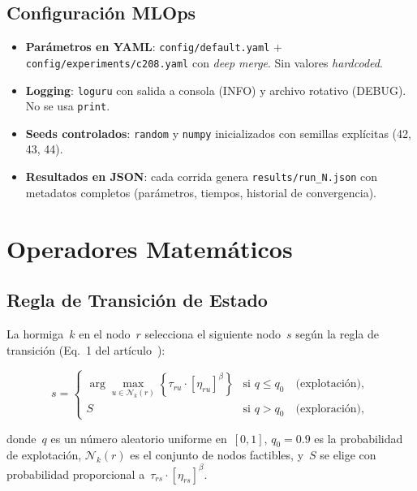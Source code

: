 \documentclass[12pt, letterpaper]{article}
\begin{document}
\subsection{Configuración MLOps}

\begin{itemize}[leftmargin=2cm]
  \item \textbf{Parámetros en YAML}: \texttt{config/default.yaml} + \texttt{config/experiments/c208.yaml} con \textit{deep merge}. Sin valores \textit{hardcoded}.
  \item \textbf{Logging}: \texttt{loguru} con salida a consola (INFO) y archivo rotativo (DEBUG). No se usa \texttt{print}.
  \item \textbf{Seeds controlados}: \texttt{random} y \texttt{numpy} inicializados con semillas explícitas (42, 43, 44).
  \item \textbf{Resultados en JSON}: cada corrida genera \texttt{results/run\_N.json} con metadatos completos (parámetros, tiempos, historial de convergencia).
\end{itemize}

\newpage
\section{Operadores Matemáticos}
\label{sec:operadores}

\subsection{Regla de Transición de Estado}

La hormiga~$k$ en el nodo~$r$ selecciona el siguiente nodo~$s$ según la regla de transición (Eq.~1 del artículo~\cite{gambardella1999}):

\begin{equation}
  s = \begin{cases}
    \displaystyle\arg\max_{u \in \mathcal{N}_k(r)} \left\{ \tau_{ru} \cdot [\eta_{ru}]^{\beta} \right\}
    & \text{si } q \leq q_0 \quad \text{(explotación)}, \\[12pt]
    S & \text{si } q > q_0 \quad \text{(exploración)},
  \end{cases}
  \label{eq:transition}
\end{equation}

\noindent donde~$q$ es un número aleatorio uniforme en~$[0,1]$, $q_0 = 0.9$ es la probabilidad de explotación, $\mathcal{N}_k(r)$ es el conjunto de nodos factibles, y~$S$ se elige con probabilidad proporcional a~$\tau_{rs} \cdot [\eta_{rs}]^{\beta}$.
\end{document}
